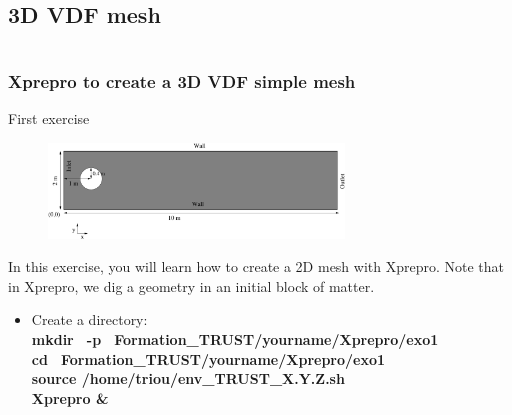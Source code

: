 \documentclass[10pt, hyperref={unicode=true,pdfusetitle, bookmarks=true,bookmarksnumbered=false,bookmarksopen=false, breaklinks=false,pdfborder={0 0 1},backref=true,colorlinks=true,linkcolor=darkblue,pageanchor}]{beamer}
\begin{document}
\subsection{3D VDF mesh}
\begin{frame}
\begin{small}
\begin{columns}[c] 
\tableofcontents[sections={1-9},currentsection, currentsubsection]
\tableofcontents[sections={10-16},currentsection, currentsubsection]
\end{columns}
\end{small}
\end{frame}
\begin{frame}
\frametitle{Xprepro to create a 3D VDF simple mesh}
\begin{block}{First exercise}

\begin{figure}
\includegraphics[width=0.7\textwidth]{PICTURES/xprepro0.pdf}
\end{figure}

In this exercise, you will learn how to create a 2D mesh with Xprepro. 
Note that in Xprepro, we dig a geometry in an initial block of matter.
\vspace{0.2cm}

\begin{itemize}
\item Create a directory:\\
\textbf{mkdir \, -p \, Formation\_TRUST/yourname/Xprepro/exo1} \\
\textbf{cd \, Formation\_TRUST/yourname/Xprepro/exo1} \\
\textbf{source /home/triou/env\_TRUST\_X.Y.Z.sh }\\
\textbf{Xprepro \&} 
\end{itemize}

\end{block}
\end{frame}
\end{document}
